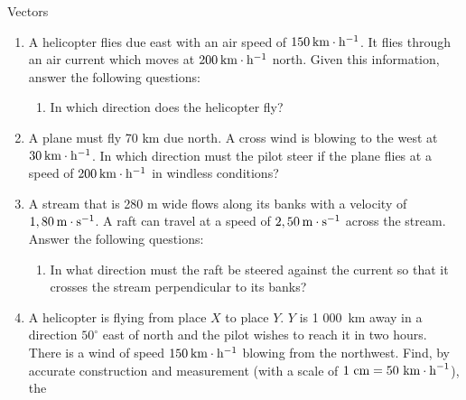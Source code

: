 \begin{eocexercises}{Vectors}
\begin{enumerate}[noitemsep, label=\textbf{\arabic*}.]
            \label{m38819*uid118}\item A helicopter flies due east with an air speed of $150\phantom{\rule{2pt}{0ex}}\text{km}\ensuremath{\cdot}\text{h}{}^{-1}$. It flies through an air current which moves at $200\phantom{\rule{2pt}{0ex}}\text{km}\ensuremath{\cdot}\text{h}{}^{-1}$ north. Given this information, answer the following questions:
\label{m38819*id198203}\begin{enumerate}[noitemsep, label=\textbf{\alph*}. ] 
            \label{m38819*uid119}\item In which direction does the helicopter fly?
\end{enumerate}
                \label{m38819*uid122}\item A plane must fly 70 km due north. A cross wind is blowing to the west at $30\phantom{\rule{2pt}{0ex}}\text{km}\ensuremath{\cdot}\text{h}{}^{-1}$. In which direction must the pilot steer if the plane flies at a speed of $200\phantom{\rule{2pt}{0ex}}\text{km}\ensuremath{\cdot}\text{h}{}^{-1}$ in windless conditions?\newline
\label{m38819*uid123}\item A stream that is 280 m wide flows along its banks with a velocity of $1,80\phantom{\rule{2pt}{0ex}}\text{m}\ensuremath{\cdot}\text{s}{}^{-1}$. A raft can travel at a speed of $2,50\phantom{\rule{2pt}{0ex}}\text{m}\ensuremath{\cdot}\text{s}{}^{-1}$ across the stream. Answer the following questions:
\label{m38819*id198337}\begin{enumerate}[noitemsep, label=\textbf{\alph*}. ] 
\label{m38819*uid126}\item In what direction must the raft be steered against the current so that it crosses the stream perpendicular to its banks?
\end{enumerate}
                \label{m38819*uid128}\item A helicopter is flying from place $X$ to place $Y$. $Y$ is 1 000~km away in a direction ${50}^{\circ }$ east of north and the pilot wishes to reach it in two hours. There is a wind of speed $150\phantom{\rule{2pt}{0ex}}\text{km}\ensuremath{\cdot}\text{h}{}^{-1}$ blowing from the northwest. Find, by accurate construction and measurement (with a scale of $1\phantom{\rule{3.33333pt}{0ex}}\text{cm}=50\phantom{\rule{3.33333pt}{0ex}}{\text{km}\ensuremath{\cdot}\text{h}}^{-1}$), the

\end{enumerate}
\end{eocexercises}
